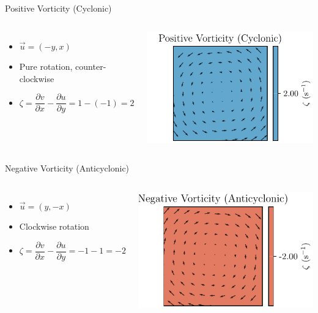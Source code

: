 \begin{frame}{Positive Vorticity (Cyclonic)}
	\begin{columns}
		\begin{itemize}
			\item \( \vec{u} = (-y, x) \)
			\item Pure rotation, counter-clockwise
			\item \( \zeta =  \dfrac{\partial v}{\partial x} - \dfrac{\partial u}{\partial y} = 1-(-1)=2 \)
		\end{itemize}

		\includegraphics[width=\linewidth]{../images/vorticity_plot3.pdf}
	\end{columns}
\end{frame}

\begin{frame}{Negative Vorticity (Anticyclonic)}
	\begin{columns}
		\column{0.5\textwidth}
		\begin{itemize}
			\item \( \vec{u} = (y, -x) \)
			\item Clockwise rotation
			\item \( \zeta = \dfrac{\partial v}{\partial x} - \dfrac{\partial u}{\partial y} = -1-1=-2 \)
		\end{itemize}

		\column{0.5\textwidth}
		\includegraphics[width=\linewidth]{../images/vorticity_plot4.pdf}
	\end{columns}
\end{frame}

